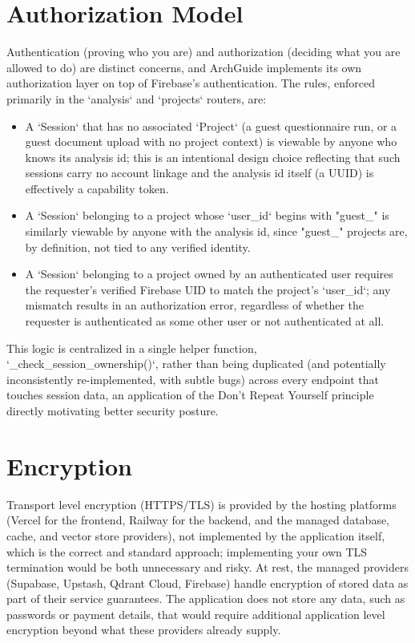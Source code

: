 \documentclass[11pt,a4paper]{report}
\begin{document}
\section{Authorization Model}

Authentication (proving who you are) and authorization (deciding what you are allowed to do) are distinct concerns, and ArchGuide implements its own authorization layer on top of Firebase's authentication. The rules, enforced primarily in the `analysis` and `projects` routers, are:

\begin{itemize}[leftmargin=*]
  \item A `Session` that has no associated `Project` (a guest questionnaire run, or a guest document upload with no project context) is viewable by anyone who knows its analysis id; this is an intentional design choice reflecting that such sessions carry no account linkage and the analysis id itself (a UUID) is effectively a capability token.
  \item A `Session` belonging to a project whose `user_id` begins with "guest\_" is similarly viewable by anyone with the analysis id, since "guest\_" projects are, by definition, not tied to any verified identity.
  \item A `Session` belonging to a project owned by an authenticated user requires the requester's verified Firebase UID to match the project's `user_id`; any mismatch results in an authorization error, regardless of whether the requester is authenticated as some other user or not authenticated at all.
\end{itemize}

This logic is centralized in a single helper function, `_check_session_ownership()`, rather than being duplicated (and potentially inconsistently re-implemented, with subtle bugs) across every endpoint that touches session data, an application of the Don't Repeat Yourself principle directly motivating better security posture.

\section{Encryption}

Transport level encryption (HTTPS/TLS) is provided by the hosting platforms (Vercel for the frontend, Railway for the backend, and the managed database, cache, and vector store providers), not implemented by the application itself, which is the correct and standard approach; implementing your own TLS termination would be both unnecessary and risky. At rest, the managed providers (Supabase, Upstash, Qdrant Cloud, Firebase) handle encryption of stored data as part of their service guarantees. The application does not store any data, such as passwords or payment details, that would require additional application level encryption beyond what these providers already supply.
\end{document}
